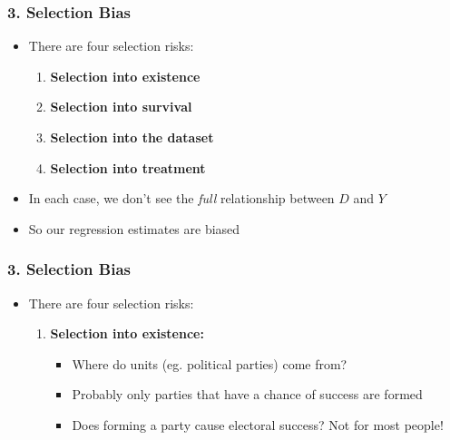 \documentclass[xcolor=x11names,compress]{beamer}\usepackage[]{graphicx}\usepackage[]{color}
\renewcommand{\(}{\begin{columns}}
\renewcommand{\)}{\end{columns}}
\newcommand{\<}[1]{\begin{column}{#1}}
\renewcommand{\>}{\end{column}}
\begin{document}
\begin{frame}
\frametitle{3. Selection Bias}
\begin{itemize}
\item There are four selection risks:
\begin{enumerate}
\item \textbf{Selection into existence}
\item \textbf{Selection into survival}
\item \textbf{Selection into the dataset}
\item \textbf{Selection into treatment}
\end{enumerate}
\pause
\item In each case, we don't see the \textit{full} relationship between $D$ and $Y$
\pause
\item So our regression estimates are biased
\end{itemize}
\end{frame}

\begin{frame}
\frametitle{3. Selection Bias}
\begin{itemize}
\item There are four selection risks:
\begin{enumerate}
\item \textbf{Selection into existence:}
\pause
\begin{itemize}
\item Where do units (eg. political parties) come from?
\pause
\item Probably only parties that have a chance of success are formed
\pause
\item Does forming a party cause electoral success? Not for most people!
\end{itemize}
\end{enumerate}
\end{itemize}
\end{frame}
\end{document}
